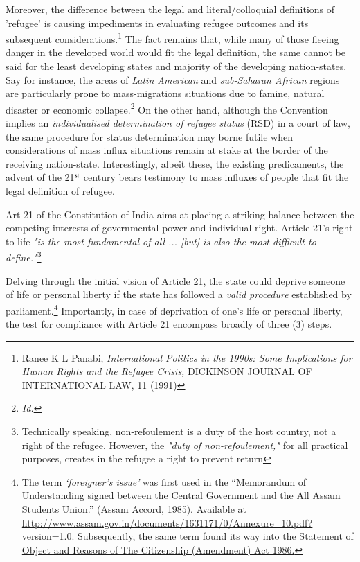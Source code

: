\begin{multicols}{2}
\noi

Moreover, the difference between the legal and literal/colloquial definitions of 'refugee' is
causing impediments in evaluating refugee outcomes and its subsequent considerations.\footnote{Ranee K L Panabi, \textit{International Politics in the 1990s: Some Implications for Human Rights and the Refugee Crisis,} DICKINSON JOURNAL OF INTERNATIONAL LAW, 11 (1991)} The fact remains that, while many of those fleeing danger in the developed world would fit the legal definition, the same cannot be said for the least developing states and majority of the
developing nation-states. Say for instance, the areas of \textit{Latin American} and \textit{sub-Saharan
African} regions are particularly prone to mass-migrations situations due to famine, natural
disaster or economic collapse.\footnote{\textit{Id.}} On the other hand, although the Convention implies an
\textit{individualised determination of refugee status} (RSD) in a court of law, the same procedure for
status determination may borne futile when considerations of mass influx situations remain at
stake at the border of the receiving nation-state. Interestingly, albeit these, the existing
predicaments, the advent of the 21$^{\rm st}$ century bears testimony to mass influxes of people that
fit the legal definition of refugee.


\noi
Art 21 of the Constitution of India aims at placing a striking balance between the competing
interests of governmental power and individual right. Article 21's right to life \textit{"is the most
fundamental of all ... [but] is also the most difficult to define."}\footnote{Technically speaking, non-refoulement is a duty of the host country, not a right of the refugee. However, the \textit{"duty of non-refoulement,"} for all practical purposes, creates in the refugee a right to prevent return}

\noi
Delving through the initial vision of Article 21, the state could deprive someone of life or
personal liberty if the state has followed a \textit{valid procedure} established by
parliament.\footnote{The term \textit{‘foreigner’s issue’} was first used in the “Memorandum of Understanding signed between the Central Government and the All Assam Students Union.” (Assam Accord, 1985). Available at \url{http://www.assam.gov.in/documents/1631171/0/Annexure_10.pdf?version=1.0. Subsequently, the same term
found its way into the Statement of Object and Reasons of The Citizenship (Amendment) Act 1986.}} Importantly, in case of deprivation of one's life or personal liberty, the test for
compliance with Article 21 encompass broadly of three (3) steps.


\end{multicols}
